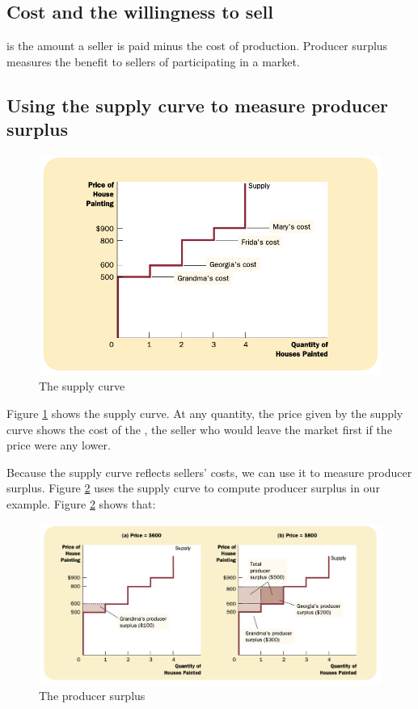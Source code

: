 \subsection{Cost and the willingness to sell}

 is the amount a seller is paid minus the cost of production.
Producer surplus measures the benefit to sellers of participating in a market.


\subsection{Using the supply curve to measure producer surplus}

\begin{figure}[!ht]
  \centering
  \includegraphics[width=\textwidth]{pics/the-supply-curve}
  \caption{The supply curve}
  \label{fig:the-supply-curve}
\end{figure}

Figure \ref{fig:the-supply-curve} shows the supply curve.
At any quantity, the price given by the supply curve shows the cost of the ,
the seller who would leave the market first if the price were any lower.


Because the supply curve reflects sellers’ costs, we can use it to measure producer surplus.
Figure \ref{fig:the-producer-surplus} uses the supply curve to compute producer surplus in our example.
Figure \ref{fig:the-producer-surplus} shows that:
\begin{figure}[!ht]
  \centering
  \includegraphics[width=\textwidth]{pics/producer-surplus}
  \caption{The producer surplus}
  \label{fig:the-producer-surplus}
\end{figure}


